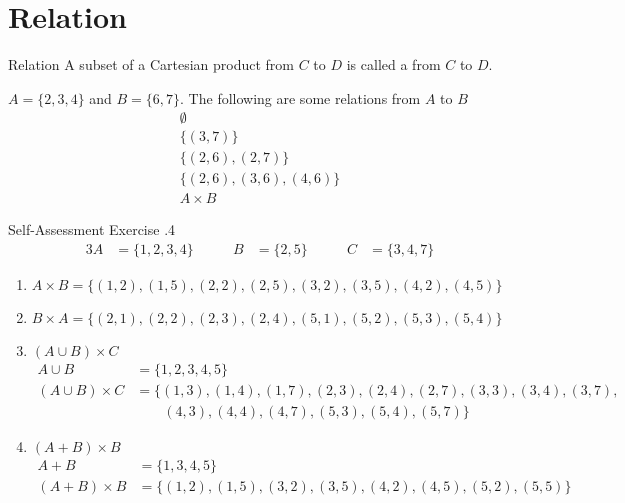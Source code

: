 \documentclass[../notes.tex]{subfiles}
\begin{document}
		\section{Relation}
			\begin{definition}{Relation}
				A subset of a Cartesian product from $C$ to $D$ is called a  from $C$ to $D$.
			\end{definition}
			\begin{example}
				$A = \{2, 3, 4\}$ and  $B = \{6, 7\}$. The following are some relations from $A$ to $B$
				\begin{align*}
					\emptyset \tag*{(This is a subset, even though it has no elements)}\\
					\bigl\{(3, 7)\bigr\}\\
					\bigl\{(2, 6), (2, 7)\bigr\}\\
					\bigl\{(2, 6), (3, 6), (4, 6)\bigr\}\\
					A \times B
				\end{align*}
			\end{example}
			\begin{exercise}{Self-Assessment Exercise \thechapter.4}
				\begin{alignat*}{3}
					A &= \{1, 2, 3, 4\} \qquad & B &= \{2, 5\} \qquad & C &= \{3, 4, 7\}
				\end{alignat*}
				\begin{enumerate}[label=(\alph*)]
					\item $A \times B = \bigl\{(1, 2), (1, 5), (2, 2), (2, 5), (3, 2), (3, 5), (4, 2), (4, 5)\bigr\}$
					\item $B \times A = \bigl\{(2, 1), (2, 2), (2, 3), (2, 4), (5, 1), (5, 2), (5, 3), (5, 4)\bigr\}$
					\item $(A \cup B) \times C$
						\begin{align*}
							A \cup B &= \{1, 2, 3, 4, 5\}\\
							(A \cup B) \times C &= \bigl\{(1, 3), (1, 4), (1, 7), (2, 3), (2, 4), (2, 7), (3, 3), (3, 4), (3, 7),\\
							& \qquad (4, 3), (4, 4), (4, 7), (5, 3), (5, 4), (5, 7)\bigr\}
						\end{align*}
					\item $(A + B) \times B$
						\begin{align*}
							A + B &= \{1, 3, 4, 5\}\\
							(A + B) \times B &= \bigl\{(1, 2), (1, 5), (3, 2), (3, 5), (4, 2), (4, 5), (5, 2), (5, 5)\bigr\}
						\end{align*}
				\end{enumerate}
			\end{exercise}
			\pagebreak
\end{document}
